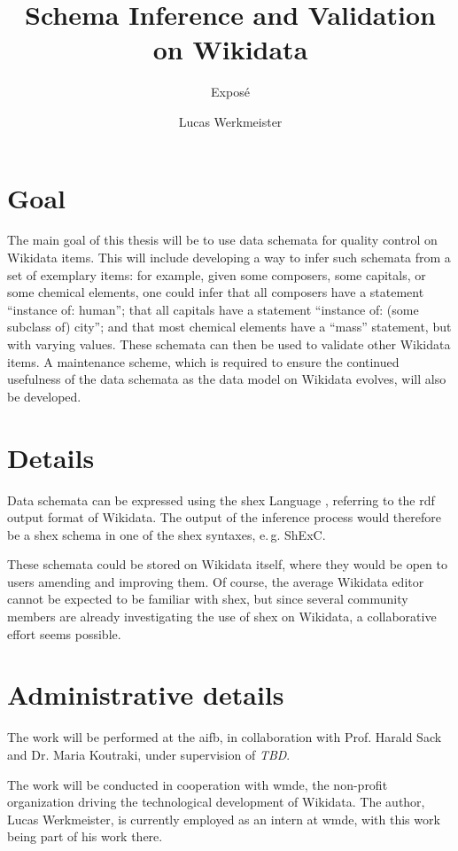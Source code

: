 \documentclass{scrartcl}
\title{Schema Inference and Validation on Wikidata}
\subtitle{Exposé}
\author{Lucas Werkmeister}
\begin{document}
\maketitle

\section{Goal}

The main goal of this thesis will be to use data schemata for quality control on Wikidata items.
This will include developing a way to infer such schemata from a set of exemplary items:
for example, given some composers, some capitals, or some chemical elements,
one could infer that all composers have a statement “instance of: human”;
that all capitals have a statement “instance of: (some subclass of) city”;
and that most chemical elements have a “mass” statement, but with varying values.
These schemata can then be used to validate other Wikidata items.
A maintenance scheme,
which is required to ensure the continued usefulness of the data schemata
as the data model on Wikidata evolves,
will also be developed.

\section{Details}

Data schemata can be expressed using the \gls{shex} Language \cite{Prud'hommeaux:2014:SER:2660517.2660523},
referring to the \gls{rdf} output format of Wikidata.
The output of the inference process would therefore be a \gls{shex} schema in one of the \gls{shex} syntaxes, e.\,g. ShExC.

These schemata could be stored on Wikidata itself,
where they would be open to users amending and improving them.
Of course, the average Wikidata editor cannot be expected to be familiar with \gls{shex},
but since several community members are already investigating the use of \gls{shex} on Wikidata,
a collaborative effort seems possible.

\section{Administrative details}

The work will be performed at the \gls{aifb},
in collaboration with Prof. Harald Sack and Dr. Maria Koutraki,
under supervision of \textit{TBD}.

The work will be conducted in cooperation with \gls{wmde},
the non-profit organization driving the technological development of Wikidata.
The author, Lucas Werkmeister, is currently employed as an intern at \gls{wmde},
with this work being part of his work there.
\end{document}
